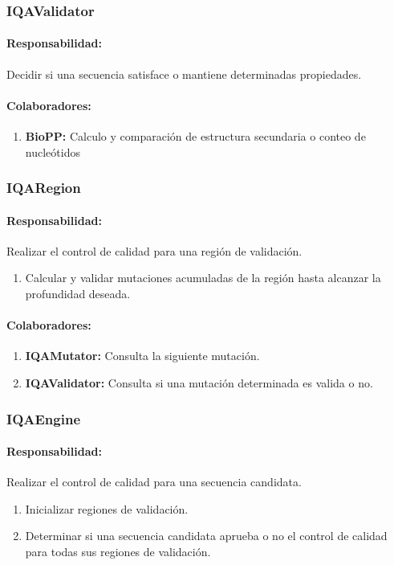   \subsubsection{IQAValidator}
    \paragraph{Responsabilidad:} Decidir si una secuencia satisface o
mantiene determinadas propiedades.
    \paragraph{Colaboradores:}
      \begin{enumerate}
       \item \textbf{BioPP:} Calculo y comparaci\'on de estructura secundaria o
conteo de nucle\'otidos
      \end{enumerate}

  \subsubsection{IQARegion}
    \paragraph{Responsabilidad:} Realizar el control de calidad para una
regi\'on de validaci\'on.
      \begin{enumerate}
       \item Calcular y validar mutaciones acumuladas de la regi\'on hasta
alcanzar la profundidad deseada.
      \end{enumerate}
    \paragraph{Colaboradores:}
      \begin{enumerate}
       \item \textbf{IQAMutator:} Consulta la siguiente mutaci\'on.
       \item \textbf{IQAValidator:} Consulta si una mutaci\'on determinada es
valida o no.
      \end{enumerate}

  \subsubsection{IQAEngine}
    \paragraph{Responsabilidad:} Realizar el control de calidad para una
secuencia candidata.
      \begin{enumerate}       
       \item Inicializar regiones de validaci\'on.
       \item Determinar si una secuencia candidata aprueba o no el control de
calidad para todas sus regiones de validaci\'on.
      \end{enumerate}

